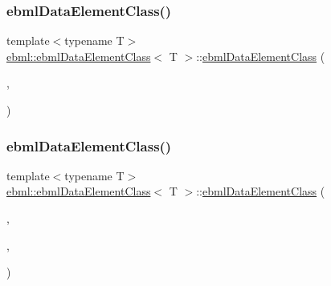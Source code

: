 \mbox{\label{classebml_1_1ebmlDataElementClass_a96c16b441ed04a1c34ff2f52d6a86655}} 
\subsubsection{\texorpdfstring{ebml\+Data\+Element\+Class()}{ebmlDataElementClass()}\hspace{0.1cm}{\footnotesize\ttfamily [4/6]}}
{\footnotesize\ttfamily template$<$typename T$>$ \\
\mbox{\hyperlink{classebml_1_1ebmlDataElementClass}{ebml\+::ebml\+Data\+Element\+Class}}$<$ T $>$\+::\mbox{\hyperlink{classebml_1_1ebmlDataElementClass}{ebml\+Data\+Element\+Class}} (\begin{DoxyParamCaption}\item[{\mbox{\hyperlink{namespaceebml_a86c5f604ddf12a74aa9812e997a58691}{ebml\+I\+D\+\_\+t}}}]{,  }\item[{const std\+::wstring \&}]{ }\end{DoxyParamCaption})}

\mbox{\label{classebml_1_1ebmlDataElementClass_a7b0726f332f9abadac8b7b4672cf1013}} 
\subsubsection{\texorpdfstring{ebml\+Data\+Element\+Class()}{ebmlDataElementClass()}\hspace{0.1cm}{\footnotesize\ttfamily [5/6]}}
{\footnotesize\ttfamily template$<$typename T$>$ \\
\mbox{\hyperlink{classebml_1_1ebmlDataElementClass}{ebml\+::ebml\+Data\+Element\+Class}}$<$ T $>$\+::\mbox{\hyperlink{classebml_1_1ebmlDataElementClass}{ebml\+Data\+Element\+Class}} (\begin{DoxyParamCaption}\item[{\mbox{\hyperlink{namespaceebml_a86c5f604ddf12a74aa9812e997a58691}{ebml\+I\+D\+\_\+t}}}]{,  }\item[{const std\+::wstring \&}]{,  }\item[{const T \&}]{ }\end{DoxyParamCaption})}

